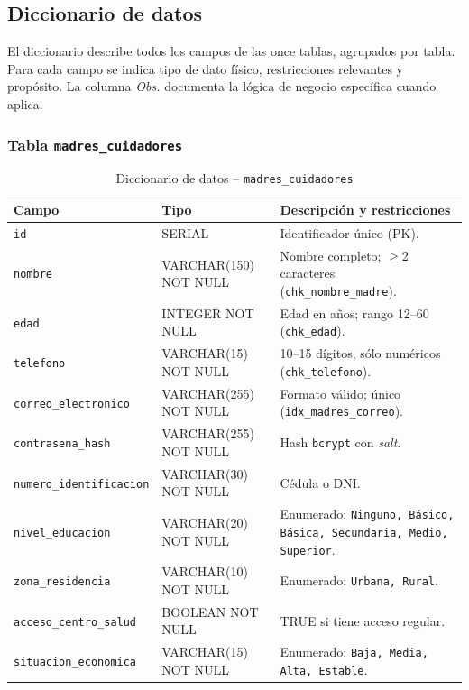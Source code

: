 \documentclass[12pt,letterpaper]{article}
\begin{document}
\subsection{Diccionario de datos}

El diccionario describe todos los campos de las once tablas, agrupados por tabla. Para cada campo se indica tipo de dato físico, restricciones relevantes y propósito. La columna \textit{Obs.} documenta la lógica de negocio específica cuando aplica.

\subsubsection{Tabla \texttt{madres\_cuidadores}}

\begin{longtable}{p{}p{}p{}}
\caption{Diccionario de datos -- \texttt{madres\_cuidadores}}\\\toprule
\textbf{Campo} & \textbf{Tipo} & \textbf{Descripción y restricciones} \\\midrule
\endhead
\texttt{id} & SERIAL & Identificador único (PK).\\\hline
\texttt{nombre} & VARCHAR(150) NOT NULL & Nombre completo; $\geq$2 caracteres (\texttt{chk\_nombre\_madre}).\\\hline
\texttt{edad} & INTEGER NOT NULL & Edad en años; rango 12--60 (\texttt{chk\_edad}).\\\hline
\texttt{telefono} & VARCHAR(15) NOT NULL & 10--15 dígitos, sólo numéricos (\texttt{chk\_telefono}).\\\hline
\texttt{correo\_electronico} & VARCHAR(255) NOT NULL & Formato válido; único (\texttt{idx\_madres\_correo}).\\\hline
\texttt{contrasena\_hash} & VARCHAR(255) NOT NULL & Hash \texttt{bcrypt} con \textit{salt}.\\\hline
\texttt{numero\_identificacion} & VARCHAR(30) NOT NULL & Cédula o DNI.\\\hline
\texttt{nivel\_educacion} & VARCHAR(20) NOT NULL & Enumerado: \texttt{Ninguno, Básico, Básica, Secundaria, Medio, Superior}.\\\hline
\texttt{zona\_residencia} & VARCHAR(10) NOT NULL & Enumerado: \texttt{Urbana, Rural}.\\\hline
\texttt{acceso\_centro\_salud} & BOOLEAN NOT NULL & TRUE si tiene acceso regular.\\\hline
\texttt{situacion\_economica} & VARCHAR(15) NOT NULL & Enumerado: \texttt{Baja, Media, Alta, Estable}.\\\hline

\end{longtable}
\end{document}
